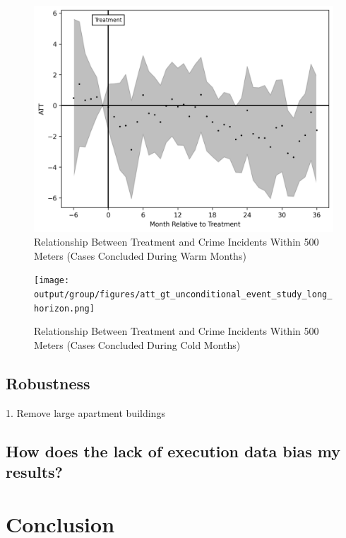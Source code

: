 \documentclass[12pt]{article}
\begin{document}
    \begin{figure}[H]
        \centering
        \includegraphics{output/group_0_crimes_cold_500m/figures/att_gt_dr_event_study_long_horizon.png}
        \caption{Relationship Between Treatment and Crime Incidents Within 500 Meters (Cases Concluded During Warm Months)}
        \label{fig:my_label}
    \end{figure}

       \begin{figure}[H]
        \centering
        \texttt{[image: output/group/figures/att\_gt\_unconditional\_event\_study\_long\_horizon.png]}
        \caption{Relationship Between Treatment and Crime Incidents Within 500 Meters (Cases Concluded During Cold Months)}
        \label{fig:my_label}
    \end{figure}


    \subsection{Robustness}
    1. Remove large apartment buildings

    
    \subsection{How does the lack of execution data bias my results?}

    


\section{Conclusion} \label{sec:conclusion}





\clearpage

\onehalfspacing

%
\end{document}
